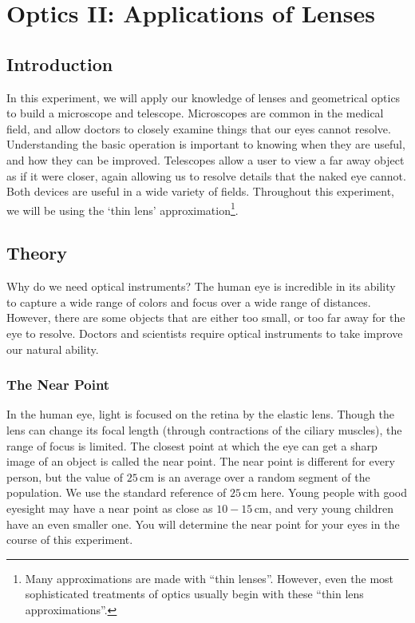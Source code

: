 \chapter{Optics II: Applications of Lenses}
\section{Introduction}
In this experiment, we will apply our knowledge of lenses and geometrical optics to build a microscope and telescope. Microscopes are common in the medical field, and allow doctors to closely examine things that our eyes cannot resolve. Understanding the basic operation is important to knowing when they are useful, and how they can be improved. Telescopes allow a user to view a far away object as if it were closer, again allowing us to resolve details that the naked eye cannot. Both devices are useful in a wide variety of fields. Throughout this experiment, we will be using the `thin lens' approximation\footnote{Many approximations are made with ``thin lenses''. However, even the most sophisticated treatments of optics usually begin with these ``thin lens approximations''.}.

\section{Theory}
Why do we need optical instruments? The human eye is incredible in its ability to capture a wide range of colors and focus over a wide range of distances. However, there are some objects that are either too small, or too far away for the eye to resolve. Doctors and scientists require optical instruments to take improve our natural ability.

\subsection{The Near Point}
In the human eye, light is focused on the retina by the elastic lens. Though the lens can change its focal length (through contractions of the ciliary muscles), the range of focus is limited. The closest point at which the eye can get a sharp image of an object is called the near point. The near point is different for every person, but the value of $25\, \textrm{cm}$ is an average over a random segment of the population. We use the standard reference of $25\, \textrm{cm}$ here. Young people with good eyesight may have a near point as close as $10-15\, \textrm{cm}$, and very young children have an even smaller one. You will determine the near point for your eyes in the course of this experiment.

